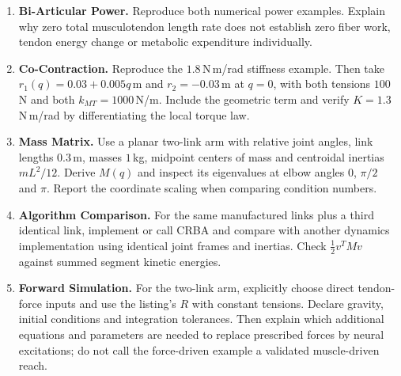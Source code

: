 \begin{enumerate}
 \item \textbf{Bi-Articular Power.} Reproduce both numerical power examples.
 Explain why zero total musculotendon length rate does not establish zero
 fiber work, tendon energy change or metabolic expenditure individually.
 \item \textbf{Co-Contraction.} Reproduce the $1.8$\,N\,m/rad stiffness example.
 Then take $r_1(q)=0.03+0.005q$\,m and $r_2=-0.03$\,m at $q=0$, with
 both tensions $100$\,N and both $k_{MT}=1000$\,N/m.
 Include the geometric term and verify $K=1.3$\,N\,m/rad by differentiating
 the local torque law.
 \item \textbf{Mass Matrix.} Use a planar two-link arm with relative joint
 angles, link lengths $0.3$\,m, masses $1$\,kg, midpoint centers of mass and
 centroidal inertias $mL^2/12$.
 Derive $M(q)$ and inspect its eigenvalues at elbow angles $0$, $\pi/2$
 and $\pi$. Report the coordinate scaling when comparing condition numbers.
 \item \textbf{Algorithm Comparison.} For the same manufactured links plus
 a third identical link, implement or call CRBA and compare with another
 dynamics implementation using identical joint frames and inertias.
 Check $\tfrac12v^TMv$ against summed segment kinetic energies.
 \item \textbf{Forward Simulation.} For the two-link arm, explicitly choose
 direct tendon-force inputs and use the listing's $R$ with constant tensions.
 Declare gravity, initial conditions and integration tolerances.
 Then explain which additional equations and parameters are needed to replace
 prescribed forces by neural excitations; do not call the force-driven example
 a validated muscle-driven reach.
\end{enumerate}
